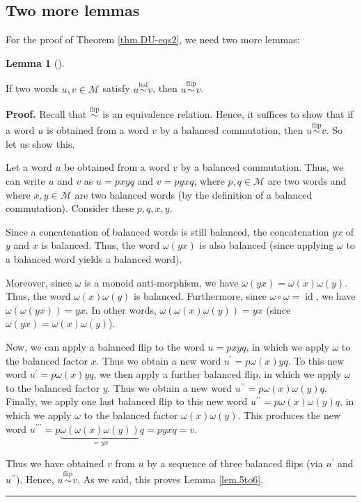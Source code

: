 \documentclass[numbers=enddot,12pt,final,onecolumn,notitlepage]{scrartcl}%
\theoremstyle{definition}
\newtheorem{lem}[theo]{Lemma}
\newenvironment{lemma}[1][]
{\begin{lem}[#1]\begin{leftbar}}
{\end{leftbar}\end{lem}}
\newenvironment{proof}[1][Proof]{\noindent\textbf{#1.} }{\ \rule{0.5em}{0.5em}}
\newcommand{\id}{\operatorname{id}}
\newcommand{\M}{\mathcal{M}}
\newcommand{\balsim}{\overset{\operatorname*{bal}}{\sim}}
\newcommand{\flipsim}{\overset{\operatorname*{flip}}{\sim}}
\newenvironment{vershort}{}{}
\begin{document}
\subsection{Two more lemmas}

For the proof of Theorem \ref{thm.DU-eqs2}, we need two more lemmas:

\begin{lemma}
\label{lem.5to6}
If two words $u,v \in \M$ satisfy $u \balsim v$,
then $u \flipsim v$.
\end{lemma}

\begin{vershort}
\begin{proof}
Recall that $\flipsim$ is an equivalence relation.
Hence, it suffices to show that if a word $u$ is obtained from a word $v$ by
a balanced commutation, then $u \flipsim v$.
So let us show this.

Let a word $u$ be obtained from a word $v$ by a balanced commutation. Thus, we
can write $u$ and $v$ as $u=pxyq$ and $v=pyxq$, where $p,q\in\M$ are
two words and where $x,y\in\M$ are two balanced words (by the
definition of a balanced commutation). Consider these $p,q,x,y$.

Since a concatenation of balanced words is still balanced, the concatenation
$yx$ of $y$ and $x$ is balanced. Thus, the word $\omega\left(  yx\right)  $ is also balanced (since
applying $\omega$ to a balanced word yields a balanced word).

Moreover, since $\omega$ is a monoid anti-morphism, we have $\omega\left(
yx\right)  =\omega\left(  x\right)  \omega\left(  y\right)  $. Thus, the word
$\omega\left(  x\right)  \omega\left(  y\right)  $ is balanced. Furthermore, since $\omega
\circ\omega = \id$, we have $\omega\left(  \omega\left(
yx\right)  \right)  =yx$. In other words, $\omega\left(  \omega\left(
x\right)  \omega\left(  y\right)  \right)  =yx$ (since $\omega\left(
yx\right)  =\omega\left(  x\right)  \omega\left(  y\right)  $).

Now, we can apply a balanced flip to the word $u=pxyq$, in which we apply
$\omega$ to the balanced factor $x$. Thus we obtain a new word $u^{\prime
}=p\omega\left(  x\right)  yq$. To this new word $u^{\prime}
=p\omega\left(  x\right)  yq$, we then
apply a further balanced flip, in which we
apply $\omega$ to the balanced factor $y$. Thus we obtain a new word
$u^{\prime\prime}=p\omega\left(  x\right)  \omega\left(  y\right)  q$.
Finally, we apply one last balanced flip to this new word $u^{\prime\prime
}=p\omega\left(  x\right)  \omega\left(  y\right)  q$, in which we apply
$\omega$ to the balanced factor $\omega\left(  x\right)  \omega\left(
y\right)  $. This produces the new word $u^{\prime\prime\prime}%
=p\underbrace{\omega\left(  \omega\left(  x\right)  \omega\left(  y\right)
\right)  }_{=yx}q=pyxq=v$.

Thus we have obtained $v$ from $u$ by a sequence of three balanced flips (via
$u^{\prime}$ and $u^{\prime\prime}$). Hence, $u \flipsim v$. As we said, this proves Lemma \ref{lem.5to6}.
\end{proof}
\end{vershort}
\end{document}

